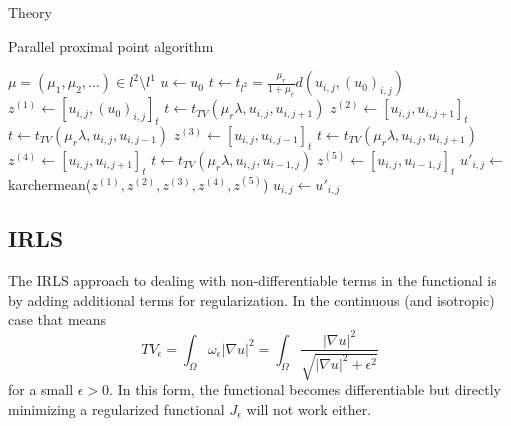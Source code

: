 \begin{chapter}{Theory}
\begin{algorithm}
\caption{Parallel proximal point algorithm}
\label{al:parallel_prpt}
\begin{algorithmic}
\REQUIRE $\mu =(\mu_1,\mu_2, \ldots)\in l^2\setminus l^1$
\STATE $u \leftarrow u_0$
\STATE $t \leftarrow t_{l^{2}}=\frac{\mu_r}{1+\mu_r}d(u_{i,j},(u_0)_{i,j})$
\STATE $z^{(1)} \leftarrow [u_{i,j},(u_0)_{i,j}]_t$
\STATE $t \leftarrow  t_{TV}(\mu_r\lambda,u_{i,j},u_{i,j+1})$
\STATE $z^{(2)} \leftarrow [u_{i,j},u_{i,j+1}]_t$
\STATE $t \leftarrow  t_{TV}(\mu_r\lambda,u_{i,j},u_{i,j-1})$
\STATE $z^{(3)} \leftarrow [u_{i,j},u_{i,j-1}]_t$
\STATE $t \leftarrow  t_{TV}(\mu_r\lambda,u_{i,j},u_{i,j+1})$
\STATE $z^{(4)} \leftarrow [u_{i,j},u_{i,j+1}]_t$
\STATE $t \leftarrow  t_{TV}(\mu_r\lambda,u_{i,j},u_{i-1,j})$
\STATE $z^{(5)} \leftarrow [u_{i,j},u_{i-1,j}]_t$
\STATE $u'_{i,j} \leftarrow$ karchermean($z^{(1)},z^{(2)},z^{(3)},z^{(4)},z^{(5)}$)
\ENDFOR
{}
\STATE $u_{i,j} \leftarrow u'_{i,j}$
\ENDFOR
\ENDFOR
\end{algorithmic}
\end{algorithm}



\subsection{IRLS} %
\label{sub:IRLS}
The IRLS approach to dealing with non-differentiable terms in the functional is by adding additional terms for regularization. In the continuous (and isotropic) case that means
\begin{equation}
    \label{eq:regulzarized_tv}
    TV_{\epsilon}=\int_{\Omega}\omega_{\epsilon}|\nabla u|^2 =\int_{\Omega}\frac{|\nabla u|^2}{\sqrt{|\nabla u|^2+\epsilon^2}}
\end{equation}
for a small $\epsilon>0$. In this form, the functional becomes differentiable but directly minimizing a
regularized functional $J_{\epsilon}$ will not work either.\\


\end{chapter}
